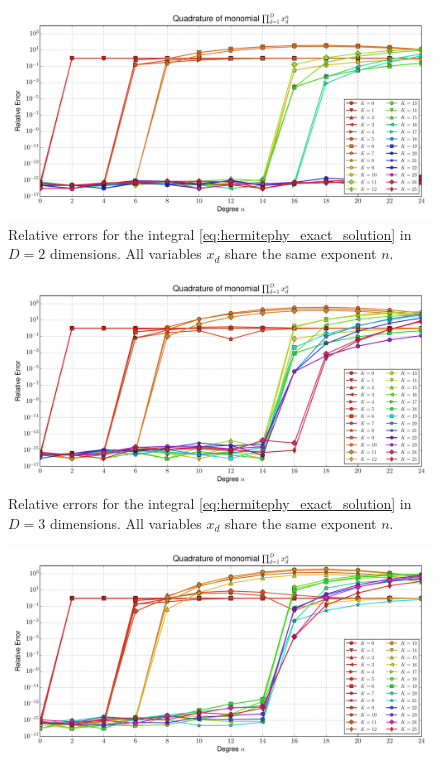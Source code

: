\documentclass[a4paper,10pt]{article}
\begin{document}
\begin{subfigures}
  \begin{figure}\centering
    \includegraphics[width=\linewidth]{./img/monomial_errors_hermitephy_multivariate_dimension_2.pdf}
    \caption{Relative errors for the integral \eqref{eq:hermitephy_exact_solution}
    in $D=2$ dimensions. All variables $x_d$ share the same exponent $n$.}
    \label{fig:monomial_errors_hermitephy_multivariate_dimension_2}
  \end{figure}
  \begin{figure}\centering
    \includegraphics[width=\linewidth]{./img/monomial_errors_hermitephy_multivariate_dimension_3.pdf}
    \caption{Relative errors for the integral \eqref{eq:hermitephy_exact_solution}
    in $D=3$ dimensions. All variables $x_d$ share the same exponent $n$.}
    \label{fig:monomial_errors_hermitephy_multivariate_dimension_3}
  \end{figure}
  \begin{figure}\centering
    \includegraphics[width=\linewidth]{./img/monomial_errors_hermitephy_multivariate_dimension_4.pdf}

\end{figure}
\end{subfigures}
\end{document}
